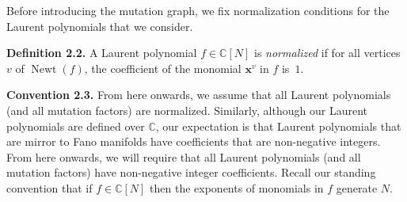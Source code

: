 Before introducing the mutation graph, we fix normalization conditions for the Laurent polynomials that we consider.

\par\noindent\textbf{Definition 2.2.}  \label{def:normalization}
A Laurent polynomial $f\in\mathbb{C}[N]$ is \emph{normalized} if for all vertices $v$ of $\operatorname{Newt}(f)$, the coefficient of the monomial $\bm{x}^v$ in $f$ is~$1$.

\par

\par\noindent\textbf{Convention 2.3.} 
From here onwards, we assume that all Laurent polynomials (and all mutation factors) are normalized. Similarly, although our Laurent polynomials are defined over $\mathbb{C}$, our expectation is that Laurent polynomials that are mirror to Fano manifolds have coefficients that are non-negative integers. From here onwards, we will require that all Laurent polynomials (and all mutation factors) have non-negative integer coefficients. Recall our standing convention that if $f \in \mathbb{C}[N]$ then the exponents of monomials in $f$ generate $N$.

\par
